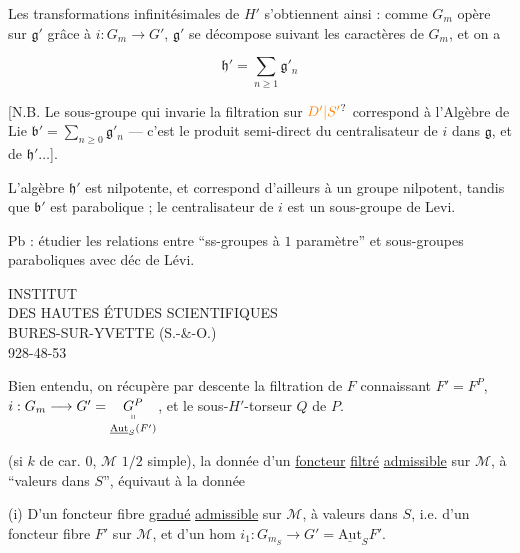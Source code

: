 Les transformations infinitésimales de $H'$ s'obtiennent ainsi : comme $G_m$ opère sur $\mathfrak g'$ grâce à $i:G_m\longrightarrow G'$, $\mathfrak g'$ se décompose suivant les caractères de $G_m$, et on a


\[
\boxed{\mathfrak h'=\sum_{n\geq1}\mathfrak g'_n}
\]


[N.B. Le sous-groupe qui invarie la filtration sur $\unsure{D'|S'}$ correspond à l'Algèbre de Lie $\mathfrak b'=\sum_{n\geq0}\mathfrak g'_n$ --- c'est le produit semi-direct du centralisateur de $i$ dans $\mathfrak g$, et de $\mathfrak h'\ldots$].


 L'algèbre $\mathfrak h'$ est nilpotente, et correspond d'ailleurs à un groupe  nilpotent, tandis que $\mathfrak b'$ est parabolique ; le centralisateur de $i$  est un sous-groupe de Levi.

Pb : étudier les relations entre ``ss-groupes à $1$ paramètre'' et sous-groupes paraboliques avec déc de Lévi.

INSTITUT\\
DES HAUTES ÉTUDES SCIENTIFIQUES\\
BURES-SUR-YVETTE (S.-\&-O.)\\
928-48-53

Bien entendu, on récupère par descente la filtration de $F$ connaissant $F'=F^P$, $i:G_m\longrightarrow G'=\underset{\underline{\mathrm{Aut}}_S(F')}{\underset{\shortparallel}{G^P}}$, et le sous-$H'$-torseur  $Q$ de $P$.

 (si $k$ de car. $0$, $\mathcal M$ $1/2$ simple), la donnée d'un \uline{foncteur}  \uline{filtré} \uline{admissible} sur $\mathcal M$, à ``valeurs dans $S$'', équivaut à la donnée

(i) D'un foncteur fibre \uline{gradué} \uline{admissible}  sur $\mathcal M$, à valeurs dans $S$, i.e. d'un foncteur fibre $F'$ sur $\mathcal M$, et d'un hom $i_1:G_{m_S}\longrightarrow G'=\underline{\mathrm{Aut}}_S F'$.

